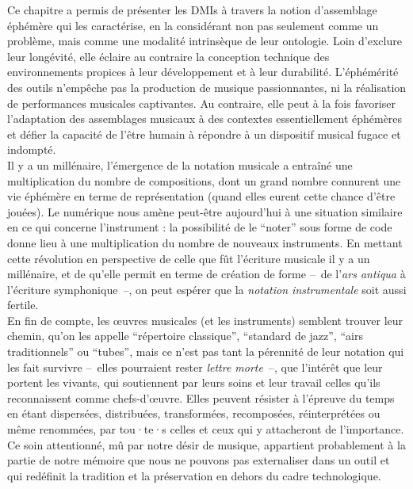 \noindent Ce chapitre a permis de présenter les \glspl{DMI} à travers la notion d'assemblage éphémère qui les caractérise, en la considérant non pas seulement comme un problème, mais comme une modalité intrinsèque de leur ontologie. Loin d'exclure leur longévité, elle éclaire au contraire la conception technique des environnements propices à leur développement et à leur durabilité. L'éphémérité des outils n'empêche pas la production de musique passionnantes, ni la réalisation de performances musicales captivantes. Au contraire, elle peut à la fois favoriser l'adaptation des assemblages musicaux à des contextes essentiellement éphémères et défier la capacité de l'être humain à répondre à un dispositif musical fugace et indompté.\\
\indent Il y a un millénaire, l'émergence de la notation musicale a entraîné une multiplication du nombre de compositions, dont un grand nombre connurent une vie éphémère en terme de représentation (quand elles eurent cette chance d'être jouées). Le numérique nous amène peut-être aujourd'hui à une situation similaire en ce qui concerne l'instrument : la possibilité de le ``noter'' sous forme de code donne lieu à une multiplication du nombre de nouveaux instruments. En mettant cette révolution en perspective de celle que fût l'écriture musicale il y a un millénaire, et de qu'elle permit en terme de création de forme --~de l'\textit{ars antiqua} à l'écriture symphonique~--, on peut espérer que la \textit{notation instrumentale} soit aussi fertile.\\
\indent En fin de compte, les œuvres musicales (et les instruments) semblent trouver leur chemin, qu'on les appelle ``répertoire classique'', ``standard de jazz'', ``airs traditionnels'' ou ``tubes'', mais ce n'est pas tant la pérennité de leur notation qui les fait survivre --~elles pourraient rester \textit{lettre morte}~--, que l'intérêt que leur portent les vivants, qui soutiennent par leurs soins et leur travail celles qu'ils reconnaissent comme chefs-d'œuvre. Elles peuvent résister à l'épreuve du temps en étant dispersées, distribuées, transformées, recomposées, réinterprétées ou même renommées, par tou·te·s celles et ceux qui y attacheront de l'importance. Ce soin attentionné, mû par notre désir de musique, appartient probablement à la partie de notre mémoire que nous ne pouvons pas externaliser dans un outil et qui redéfinit la tradition et la préservation en dehors du cadre technologique.\\

